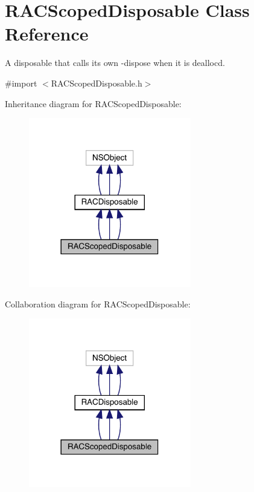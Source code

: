 \hypertarget{interface_r_a_c_scoped_disposable}{}\section{R\+A\+C\+Scoped\+Disposable Class Reference}
\label{interface_r_a_c_scoped_disposable}


A disposable that calls its own -\/dispose when it is dealloc\textquotesingle{}d.  




{\ttfamily \#import $<$R\+A\+C\+Scoped\+Disposable.\+h$>$}



Inheritance diagram for R\+A\+C\+Scoped\+Disposable\+:\nopagebreak
\begin{figure}[H]
\begin{center}
\leavevmode
\includegraphics[width=201pt]{interface_r_a_c_scoped_disposable__inherit__graph}
\end{center}
\end{figure}


Collaboration diagram for R\+A\+C\+Scoped\+Disposable\+:\nopagebreak
\begin{figure}[H]
\begin{center}
\leavevmode
\includegraphics[width=201pt]{interface_r_a_c_scoped_disposable__coll__graph}
\end{center}
\end{figure}
